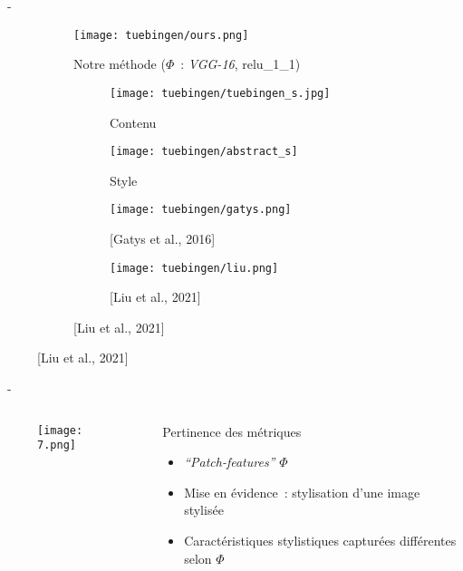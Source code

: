 \documentclass[aspectratio=169, 22pt]{beamer}
\begin{document}
\begin{frame}{\secname~- \subsecname}
  \begin{figure}
    \begin{subfigure}{0.47\linewidth}
      \texttt{[image: tuebingen/ours.png]}
      \caption{Notre méthode ($\Phi$ : \emph{VGG-16}, relu\_1\_1)}
    \end{subfigure}
    \begin{subfigure}{0.45\linewidth}
      \begin{subfigure}{0.45\linewidth}
        \texttt{[image: tuebingen/tuebingen\_s.jpg]}
        \caption{Contenu}
      \end{subfigure}
      \begin{subfigure}{0.45\linewidth}
        \texttt{[image: tuebingen/abstract\_s]}
        \caption{Style}
      \end{subfigure}

      \begin{subfigure}{0.45\linewidth}
        \texttt{[image: tuebingen/gatys.png]}
        \caption{\scriptsize[Gatys et al., 2016]}
      \end{subfigure}
      \begin{subfigure}{0.45\linewidth}
        \texttt{[image: tuebingen/liu.png]}
        \caption{[Liu et al., 2021]}
      \end{subfigure}
    \end{subfigure}
  \end{figure}
\end{frame}


\begin{frame}{\secname~- \subsecname}
  \begin{columns}
    \begin{column}{0.52\linewidth}
      \begin{figure}
        \centering
        \texttt{[image: 7.png]}
      \end{figure}
    \end{column}
    \begin{column}{0.48\linewidth}
      \begin{block}{Pertinence des métriques}
        \begin{itemize}
        \item \emph{``Patch-features''} $\Phi$
        \item Mise en évidence : stylisation d'une image stylisée
        \item Caractéristiques stylistiques capturées différentes selon $\Phi$
        \end{itemize}
      \end{block}
    \end{column}
  \end{columns}
\end{frame}
\end{document}
